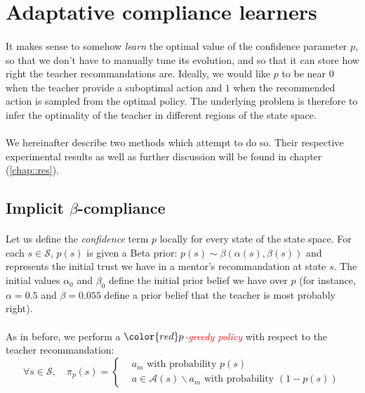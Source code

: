 \documentclass[a4paper]{report}
\begin{document}
{{	\section{Adaptative compliance learners}
	{	
		\label{section::adaptative_learners}
		\paragraph{} It makes sense to somehow \emph{learn} the optimal value of the confidence parameter $p$, so that we don't have to manually tune its evolution, and so that it can store how right the teacher recommandations are. Ideally, we would like $p$ to be near $0$ when the teacher provide a suboptimal action and $1$ when the recommended action is sampled from the optimal policy. The underlying problem is therefore to infer the optimality of the teacher in different regions of the state space. 
		
		\paragraph{}We hereinafter describe two methods which attempt to do so. Their respective experimental results as well as further discussion will be found in chapter (\ref{chap::res}).  
		
		\subsection{Implicit $\beta$-compliance}
		{
			\paragraph{}  Let us define the \emph{confidence} term $p$ locally for every state of the state space. For each $s\in\mathcal{S}$, $p(s)$ is given a Beta prior: $p(s)\sim \beta(\alpha(s),\beta(s))$ and represents the initial trust we have in a mentor's recommandation at state $s$. The initial values $\alpha_0$ and $\beta_0$ define the initial prior belief we have over $p$ (for instance, $\alpha=0.5$ and $\beta = 0.055$ define a prior belief that the teacher is most probably right). 
			
			\paragraph{} As in before, we perform a $\color{red}p$\textcolor{red}{\emph{-greedy policy}} with respect to the teacher recommandation: 
			\begin{equation}
				\forall s\in\mathcal{S}, \quad \pi_p(s) = 
					\left\{ 
					\begin{aligned}
						&a_m \text{ with probability } p(s) \\
						& a\in\mathcal{A}(s)\backslash{a_m} \text{ with probability } (1-p(s))
					\end{aligned}
					\right. 
			\end{equation}
			
}}}}
\end{document}
